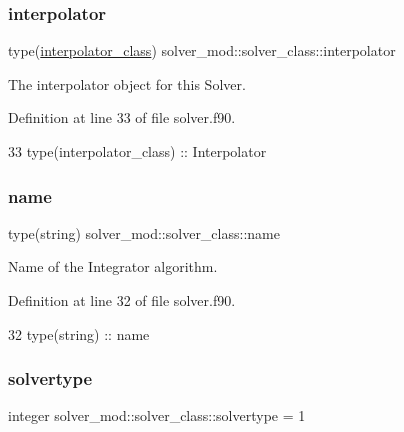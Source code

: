 \subsubsection{\texorpdfstring{interpolator}{interpolator}}
{\footnotesize\ttfamily type(\mbox{\hyperlink{structinterpolator__mod_1_1interpolator__class}{interpolator\+\_\+class}}) solver\+\_\+mod\+::solver\+\_\+class\+::interpolator\hspace{0.3cm}{\ttfamily [private]}}



The interpolator object for this Solver. 



Definition at line 33 of file solver.\+f90.


\begin{DoxyCode}
33         \textcolor{keywordtype}{type}(interpolator\_class) :: Interpolator
\end{DoxyCode}
\mbox{\label{structsolver__mod_1_1solver__class_a0a2677f8e0403b82095b826378f9439d}} 
\subsubsection{\texorpdfstring{name}{name}}
{\footnotesize\ttfamily type(string) solver\+\_\+mod\+::solver\+\_\+class\+::name\hspace{0.3cm}{\ttfamily [private]}}



Name of the Integrator algorithm. 



Definition at line 32 of file solver.\+f90.


\begin{DoxyCode}
32         \textcolor{keywordtype}{type}(string) :: name
\end{DoxyCode}
\mbox{\label{structsolver__mod_1_1solver__class_a6bd9eec5b3a11d34981b191b54944ac4}} 
\subsubsection{\texorpdfstring{solvertype}{solvertype}}
{\footnotesize\ttfamily integer solver\+\_\+mod\+::solver\+\_\+class\+::solvertype = 1\hspace{0.3cm}{\ttfamily [private]}}



